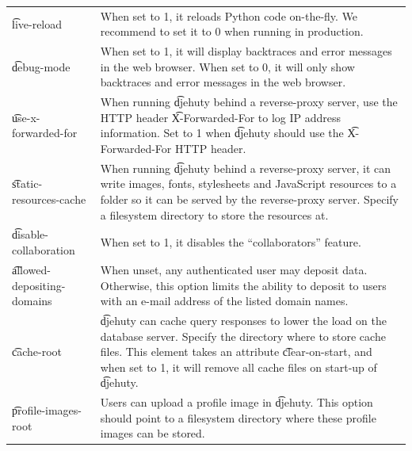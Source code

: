 \begin{tabularx}{\textwidth}{*{1}{!{\VRule[-1pt]}l}!{\VRule[-1pt]}X}
  \t{live-reload}            & When set to 1, it reloads Python code on-the-fly.
                               We recommend to set it to 0 when running in
                               production.\\
  \t{debug-mode}             & When set to 1, it will display backtraces and
                               error messages in the web browser. When set to 0,
                               it will only show backtraces and error messages
                               in the web browser.\\
  \t{use-x-forwarded-for}    & When running \t{djehuty} behind a reverse-proxy
                               server, use the HTTP header \t{X-Forwarded-For}
                               to log IP address information.  Set to 1 when
                               \t{djehuty} should use the \t{X-Forwarded-For}
                               HTTP header.\\
  \t{static-resources-cache} & When running \t{djehuty} behind a reverse-proxy
                               server, it can write images, fonts, stylesheets
                               and JavaScript resources to a folder so it can
                               be served by the reverse-proxy server. Specify
                               a filesystem directory to store the resources
                               at.\\
  \t{disable-collaboration}  & When set to 1, it disables the ``collaborators''
                               feature.\\
  \t{allowed-depositing-domains} & When unset, any authenticated user may
                               deposit data.  Otherwise, this option limits the
                               ability to deposit to users with an e-mail
                               address of the listed domain names.\\
  \t{cache-root}             & \t{djehuty} can cache query responses to lower
                               the load on the database server.  Specify the
                               directory where to store cache files.  This
                               element takes an attribute \t{clear-on-start},
                               and when set to 1, it will remove all cache files
                               on start-up of \t{djehuty}.\\
  \t{profile-images-root}    & Users can upload a profile image in \t{djehuty}.
                               This option should point to a filesystem directory
                               where these profile images can be stored.\\

\end{tabularx}
